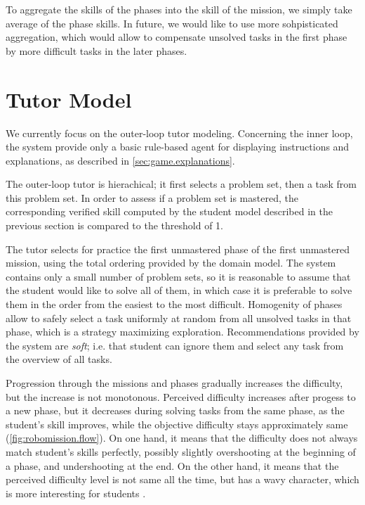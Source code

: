 To aggregate the skills of the phases into the skill of the mission,
we simply take average of the phase skills.
In future, we would like to use more sohpisticated aggregation,
which would allow to compensate unsolved tasks in the first phase
by more difficult tasks in the later phases.

\section{Tutor Model}
\label{robomission.tutor}

We currently focus on the outer-loop tutor modeling.
Concerning the inner loop, the system provide only a basic
rule-based agent for displaying instructions and explanations,
as described in \cref{sec:game.explanations}.

The outer-loop tutor is hierachical;
it first selects a problem set, then a task from this problem set.
In order to assess if a problem set is mastered,
the corresponding verified skill
computed by the student model described in the previous section
is compared to the threshold of 1. %

The tutor selects for practice the first unmastered phase of the first
unmastered mission, using the total ordering provided by the domain model.
The system contains only a small number of problem sets,
so it is reasonable to assume that the student would like to solve all of
them,
in which case it is preferable to solve them in the order from the
easiest to the most difficult.
Homogenity of phases allow to safely select a task uniformly at random from
all unsolved tasks in that phase, which is a strategy maximizing exploration.
Recommendations provided by the system are \emph{soft};
i.e. that student can ignore them and select any task
from the overview of all tasks.

Progression through the missions and phases gradually increases the difficulty,
but the increase is not monotonous.
Perceived difficulty increases after progess to a new phase,
but it decreases during solving tasks from the same phase,
as the student's skill improves, while the objective difficulty stays
approximately same (\cref{fig:robomission.flow}).
On one hand, it means that the difficulty does not always match student's
skills perfectly, possibly slightly overshooting at the beginning of a phase,
and undershooting at the end.
On the other hand, it means that the perceived difficulty level is not
same all the time, but has a wavy character, which is more interesting
for students %
\cite{book-of-lenses}.

